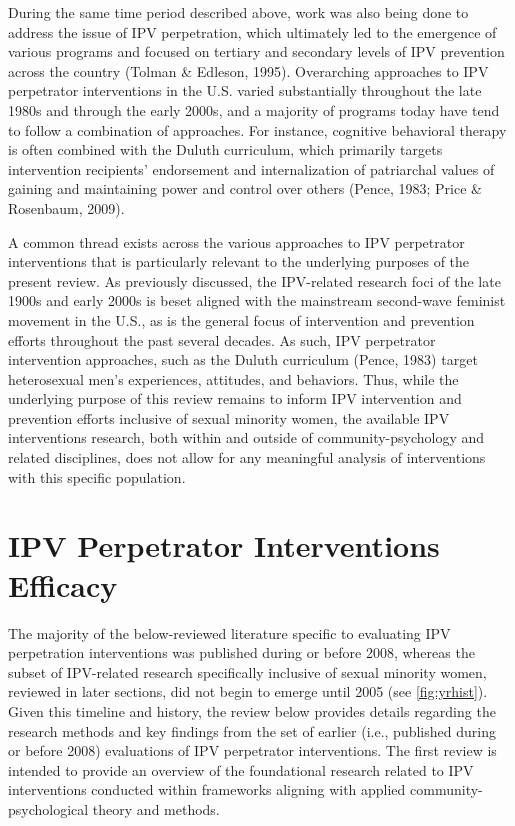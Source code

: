 \documentclass[11pt,]{tufte-book}
\begin{document}
During the same time period described above, work was also being done to
address the issue of IPV perpetration, which ultimately led to the
emergence of various programs and focused on tertiary and secondary
levels of IPV prevention across the country (Tolman \& Edleson, 1995).
Overarching approaches to IPV perpetrator interventions in the U.S.
varied substantially throughout the late 1980s and through the early
2000s, and a majority of programs today have tend to follow a
combination of approaches. For instance, cognitive behavioral therapy is
often combined with the Duluth curriculum, which primarily targets
intervention recipients' endorsement and internalization of patriarchal
values of gaining and maintaining power and control over others (Pence,
1983; Price \& Rosenbaum, 2009).

A common thread exists across the various approaches to IPV perpetrator
interventions that is particularly relevant to the underlying purposes
of the present review. As previously discussed, the IPV-related research
foci of the late 1900s and early 2000s is beset aligned with the
mainstream second-wave feminist movement in the U.S., as is the general
focus of intervention and prevention efforts throughout the past several
decades. As such, IPV perpetrator intervention approaches, such as the
Duluth curriculum (Pence, 1983) target heterosexual men's experiences,
attitudes, and behaviors. Thus, while the underlying purpose of this
review remains to inform IPV intervention and prevention efforts
inclusive of sexual minority women, the available IPV interventions
research, both within and outside of community-psychology and related
disciplines, does not allow for any meaningful analysis of interventions
with this specific population.

\section{IPV Perpetrator Interventions
Efficacy}\label{ipv-perpetrator-interventions-efficacy}

The majority of the below-reviewed literature specific to evaluating IPV
perpetration interventions was published during or before 2008, whereas
the subset of IPV-related research specifically inclusive of sexual
minority women, reviewed in later sections, did not begin to emerge
until 2005 (see \cref{fig:yrhist}). Given this timeline
and history, the review below provides details regarding the research
methods and key findings from the set of earlier (i.e., published during
or before 2008) evaluations of IPV perpetrator interventions. The first
review is intended to provide an overview of the foundational research
related to IPV interventions conducted within frameworks aligning with
applied community-psychological theory and methods.
\end{document}
